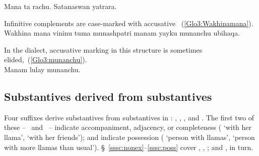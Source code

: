 {%
%
{Mana ta rachu. Satanaswan yatrara.}%
{}%
{}{}%

\noindent
Infinitive complements are case-marked with accusative ~(\ref{Glo3:Wakhinamana}).\\

%
{Wakhina mana vininu tuma munashpatri manam yayku munanchu ubihaqa.}%
{}%
{}{}%

\noindent
In the \CH{} dialect, accusative marking in this structure is sometimes elided,~(\ref{Glo3:munanchu}).\\

%
{Manam lulay munanchu.}%
{}%
{}{}%

\subsection{Substantives derived from substantives}\label{ssec:sdfs}
Four suffixes derive substantives from substantives in \SYQ{}: , , , and . The first two of these --~ and ~-- indicate accompaniment, adjacency, or completeness ( ‘with her llama’,  ‘with her friends’);  and  indicate possession ( ‘person with llamas’,  ‘person with more llamas than usual’). §~\ref{sssc:nonex}--\ref{sssc:poss} cover , , ; and , in turn.

}
